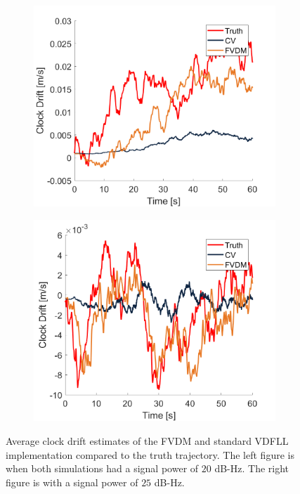 \begin{figure}[!ht]
    \begin{subfigure}{.45\textwidth}
        \centering
        \includegraphics[width=1\linewidth]{Figures/dynamic/25/CLOCKDRIFT.png}
    \end{subfigure}
    \begin{subfigure}{.45\textwidth}
        \centering
        \includegraphics[width=1\linewidth]{Figures/dynamic/35/CLOCKDRIFT.png}
    \end{subfigure}
    \caption{Average clock drift estimates of the FVDM and standard VDFLL implementation compared to the truth trajectory. The left figure is when both simulations had a signal power of \(20\) dB-Hz. The right figure is with a signal power of \(25\) dB-Hz.}\label{fig:Clocks4}
\end{figure}

